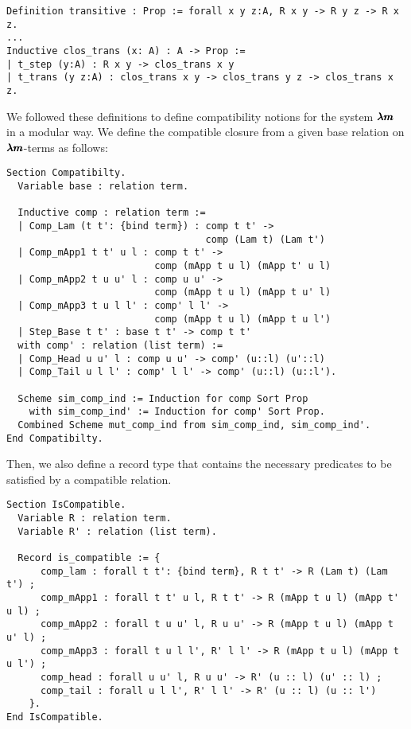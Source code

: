 \begin{lstlisting}[language=Coq]
Definition transitive : Prop := forall x y z:A, R x y -> R y z -> R x z.
...
Inductive clos_trans (x: A) : A -> Prop :=
| t_step (y:A) : R x y -> clos_trans x y
| t_trans (y z:A) : clos_trans x y -> clos_trans y z -> clos_trans x z.
\end{lstlisting}

We followed these definitions to define compatibility notions for the system $\pmb{\lambda m}$ in a modular way.
We define the compatible closure from a given base relation on $\pmb{\lambda m}$-terms as follows:

\begin{lstlisting}[language=Coq]
Section Compatibilty.
  Variable base : relation term.
  
  Inductive comp : relation term :=
  | Comp_Lam (t t': {bind term}) : comp t t' ->
                                   comp (Lam t) (Lam t')
  | Comp_mApp1 t t' u l : comp t t' ->
                          comp (mApp t u l) (mApp t' u l)
  | Comp_mApp2 t u u' l : comp u u' ->
                          comp (mApp t u l) (mApp t u' l)
  | Comp_mApp3 t u l l' : comp' l l' ->
                          comp (mApp t u l) (mApp t u l')
  | Step_Base t t' : base t t' -> comp t t'
  with comp' : relation (list term) :=
  | Comp_Head u u' l : comp u u' -> comp' (u::l) (u'::l)
  | Comp_Tail u l l' : comp' l l' -> comp' (u::l) (u::l').

  Scheme sim_comp_ind := Induction for comp Sort Prop
    with sim_comp_ind' := Induction for comp' Sort Prop.
  Combined Scheme mut_comp_ind from sim_comp_ind, sim_comp_ind'.
End Compatibilty.
\end{lstlisting}

Then, we also define a record type that contains the necessary predicates to be satisfied by a compatible relation.

\begin{lstlisting}[language=Coq]
Section IsCompatible.
  Variable R : relation term.
  Variable R' : relation (list term).

  Record is_compatible := {
      comp_lam : forall t t': {bind term}, R t t' -> R (Lam t) (Lam t') ;
      comp_mApp1 : forall t t' u l, R t t' -> R (mApp t u l) (mApp t' u l) ;
      comp_mApp2 : forall t u u' l, R u u' -> R (mApp t u l) (mApp t u' l) ;
      comp_mApp3 : forall t u l l', R' l l' -> R (mApp t u l) (mApp t u l') ;
      comp_head : forall u u' l, R u u' -> R' (u :: l) (u' :: l) ;
      comp_tail : forall u l l', R' l l' -> R' (u :: l) (u :: l')
    }.
End IsCompatible.
\end{lstlisting}

